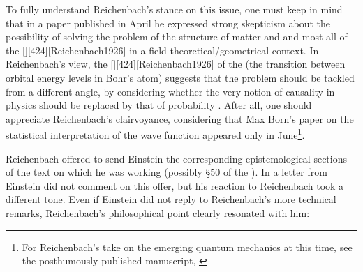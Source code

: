 \documentclass[draft]{article}
\begin{document}
To fully understand Reichenbach's stance on this issue, one must keep in mind that in a paper published in April \citep{Reichenbach1926} he expressed strong skepticism about the possibility of solving the problem of the  structure of matter and and most all of the [][424][Reichenbach1926] in a field-theoretical/geometrical context. In Reichenbach's view, the [][424][Reichenbach1926] of the  (the transition between orbital energy levels in Bohr's atom) suggests that the problem should be tackled from a different angle, by considering whether the very notion of causality in physics should be replaced by that of probability \citep[424]{Reichenbach1926}. After all, one should appreciate Reichenbach's clairvoyance, considering that Max Born's paper \citep{Born1926a} on the statistical interpretation of the wave function appeared only in June\footnote{For Reichenbach's take on the emerging quantum mechanics at this time, see the posthumously published manuscript, \cite{Reichenbach1926e}}.

Reichenbach offered to send Einstein the corresponding epistemological sections of the text on which he was working (possibly \S50 of the \Ap). In a letter from  Einstein did not comment on this offer, but his reaction to Reichenbach took a different tone. Even if Einstein did not reply to Reichenbach's more technical remarks, Reichenbach's philosophical point clearly resonated with him:
\end{document}
